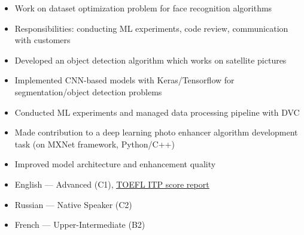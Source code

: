 \documentclass[10pt,a4paper,ragged2e]{altacv}
\begin{document}

\begin{itemize}
	\item Work on dataset optimization problem for face recognition algorithms
	\item Responsibilities: conducting ML experiments, code review, communication with customers
\end{itemize}

\divider

\begin{itemize}
	\item Developed an object detection algorithm which works on satellite pictures
	\item Implemented CNN-based models with Keras/Tensorflow for segmentation/object detection problems
	\item Conducted ML experiments and managed data processing pipeline with DVC
\end{itemize}

\divider

\begin{itemize}
	\item Made contribution to a deep learning photo enhancer algorithm development task (on MXNet framework, Python/C++)
	\item Improved model architecture and enhancement quality
\end{itemize}

%



\begin{itemize}
	\item English --- Advanced (C1), \href{https://drive.google.com/file/d/14oqfequJqcq9vEdPJPcqDdyJOfVXARDN/view?usp=sharing}{\underline{TOEFL ITP score report}}
	\item Russian --- Native Speaker (C2)
	\item French --- Upper-Intermediate (B2)
\end{itemize}
\end{document}
